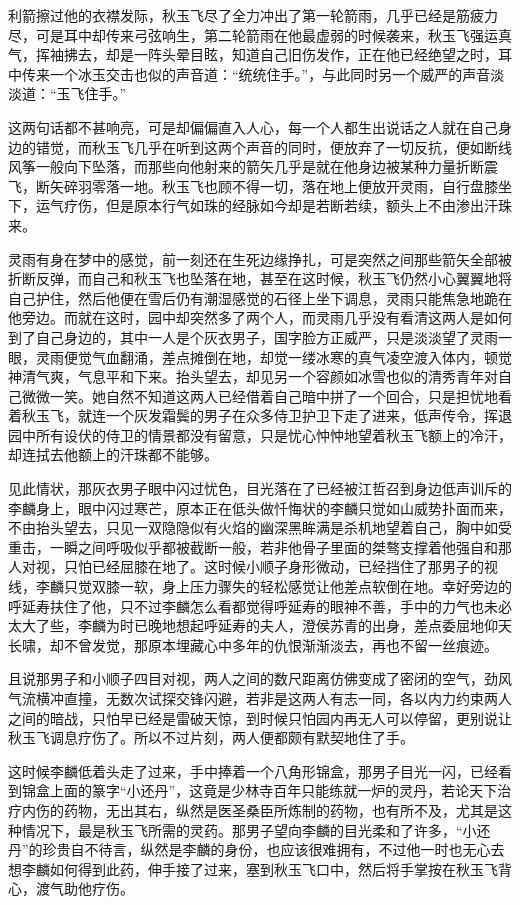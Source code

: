 利箭擦过他的衣襟发际，秋玉飞尽了全力冲出了第一轮箭雨，几乎已经是筋疲力尽，可是耳中却传来弓弦响生，第二轮箭雨在他最虚弱的时候袭来，秋玉飞强运真气，挥袖拂去，却是一阵头晕目眩，知道自己旧伤发作，正在他已经绝望之时，耳中传来一个冰玉交击也似的声音道：“统统住手。”，与此同时另一个威严的声音淡淡道：“玉飞住手。”

这两句话都不甚响亮，可是却偏偏直入人心，每一个人都生出说话之人就在自己身边的错觉，而秋玉飞几乎在听到这两个声音的同时，便放弃了一切反抗，便如断线风筝一般向下坠落，而那些向他射来的箭矢几乎是就在他身边被某种力量折断震飞，断矢碎羽零落一地。秋玉飞也顾不得一切，落在地上便放开灵雨，自行盘膝坐下，运气疗伤，但是原本行气如珠的经脉如今却是若断若续，额头上不由渗出汗珠来。

灵雨有身在梦中的感觉，前一刻还在生死边缘挣扎，可是突然之间那些箭矢全部被折断反弹，而自己和秋玉飞也坠落在地，甚至在这时候，秋玉飞仍然小心翼翼地将自己护住，然后他便在雪后仍有潮湿感觉的石径上坐下调息，灵雨只能焦急地跪在他旁边。而就在这时，园中却突然多了两个人，而灵雨几乎没有看清这两人是如何到了自己身边的，其中一人是个灰衣男子，国字脸方正威严，只是淡淡望了灵雨一眼，灵雨便觉气血翻涌，差点摊倒在地，却觉一缕冰寒的真气凌空渡入体内，顿觉神清气爽，气息平和下来。抬头望去，却见另一个容颜如冰雪也似的清秀青年对自己微微一笑。她自然不知道这两人已经借着自己暗中拼了一个回合，只是担忧地看着秋玉飞，就连一个灰发霜鬓的男子在众多侍卫护卫下走了进来，低声传令，挥退园中所有设伏的侍卫的情景都没有留意，只是忧心忡忡地望着秋玉飞额上的冷汗，却连拭去他额上的汗珠都不能够。

见此情状，那灰衣男子眼中闪过忧色，目光落在了已经被江哲召到身边低声训斥的李麟身上，眼中闪过寒芒，原本正在低头做忏悔状的李麟只觉如山威势扑面而来，不由抬头望去，只见一双隐隐似有火焰的幽深黑眸满是杀机地望着自己，胸中如受重击，一瞬之间呼吸似乎都被截断一般，若非他骨子里面的桀骜支撑着他强自和那人对视，只怕已经屈膝在地了。这时候小顺子身形微动，已经挡住了那男子的视线，李麟只觉双膝一软，身上压力骤失的轻松感觉让他差点软倒在地。幸好旁边的呼延寿扶住了他，只不过李麟怎么看都觉得呼延寿的眼神不善，手中的力气也未必太大了些，李麟为时已晚地想起呼延寿的夫人，澄侯苏青的出身，差点委屈地仰天长啸，却不曾发觉，那原本埋藏心中多年的仇恨渐渐淡去，再也不留一丝痕迹。

且说那男子和小顺子四目对视，两人之间的数尺距离仿佛变成了密闭的空气，劲风气流横冲直撞，无数次试探交锋闪避，若非是这两人有志一同，各以内力约束两人之间的暗战，只怕早已经是雷破天惊，到时候只怕园内再无人可以停留，更别说让秋玉飞调息疗伤了。所以不过片刻，两人便都颇有默契地住了手。

这时候李麟低着头走了过来，手中捧着一个八角形锦盒，那男子目光一闪，已经看到锦盒上面的篆字“小还丹”，这竟是少林寺百年只能练就一炉的灵丹，若论天下治疗内伤的药物，无出其右，纵然是医圣桑臣所炼制的药物，也有所不及，尤其是这种情况下，最是秋玉飞所需的灵药。那男子望向李麟的目光柔和了许多，“小还丹”的珍贵自不待言，纵然是李麟的身份，也应该很难拥有，不过他一时也无心去想李麟如何得到此药，伸手接了过来，塞到秋玉飞口中，然后将手掌按在秋玉飞背心，渡气助他疗伤。

